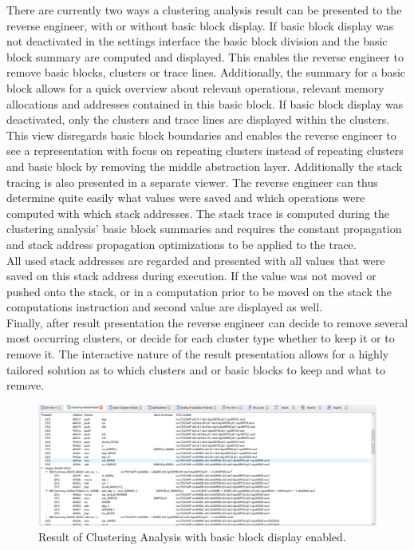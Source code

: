 \documentclass[10pt,twoside,a4paper,bibliography=totoc]{scrbook}
\begin{document}
There are currently two ways a clustering analysis result can be presented to the reverse engineer, with or without basic block display.
If basic block display was not deactivated in the settings interface the basic block division and the basic block summary are computed and displayed.
This enables the reverse engineer to remove basic blocks, clusters or trace lines. 
Additionally, the summary for a basic block allows for a quick overview about relevant operations, relevant memory allocations and addresses contained in this basic block.
If basic block display was deactivated, only the clusters and trace lines are displayed within the clusters. This view disregards basic block boundaries and enables the reverse engineer to see a representation with focus on repeating clusters instead of repeating clusters and basic block by removing the middle abstraction layer. 
\newline
Additionally the stack tracing is also presented in a separate viewer. The reverse engineer can thus determine quite easily what values were saved and which operations were computed with which stack addresses. 
The stack trace is computed during the clustering analysis' basic block summaries and requires the constant propagation and stack address propagation optimizations to be applied to the trace. \\
All used stack addresses are regarded and presented with all values that were saved on this stack address during execution. If the value was not moved or pushed onto the stack, or in a computation prior to be moved on the stack the computations instruction and second value are displayed as well.\\
Finally, after result presentation the reverse engineer can decide to remove several most occurring clusters, or decide for each cluster type whether to keep it or to remove it. The interactive nature of the result presentation allows for a highly tailored solution as to which clusters and or basic blocks to keep and what to remove.

\begin{figure}[H]
\centering
\includegraphics[scale=0.50]{images/ch3/clustering1.png}
\caption{Result of Clustering Analysis with basic block display enabled.}
\label{clu_result}
\end{figure}
\end{document}
